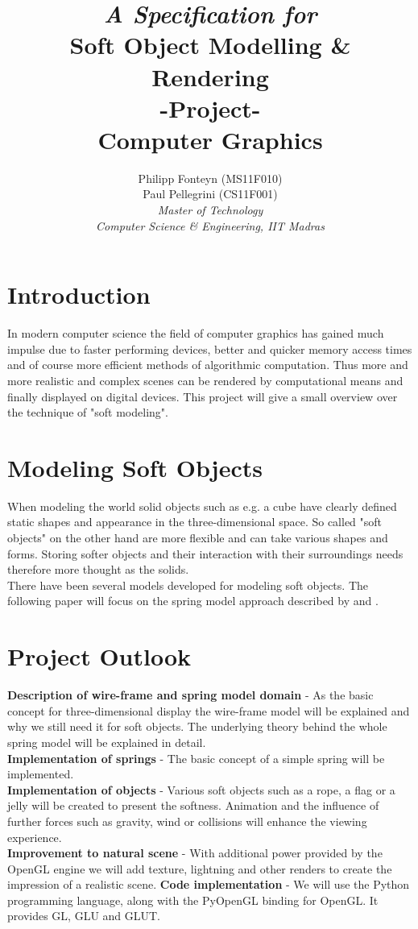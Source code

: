\documentclass[11pt]{article}
\title{
	\emph{A Specification for}\\
	\huge{\textbf{Soft Object Modelling \& Rendering} }\\
	-Project-\\
	Computer Graphics\\[2em]	
}
\author{
	Philipp Fonteyn (MS11F010)\\
	Paul Pellegrini (CS11F001)\\[2em]
	\emph{Master of Technology}\\
	\emph{Computer Science \& Engineering, IIT Madras}
}
\begin{document}
\maketitle
\newpage

%
%
%
\section{Introduction}
In modern computer science the field of computer graphics has gained much impulse due to faster performing devices, better and quicker memory access times and of course more efficient methods of algorithmic computation. Thus more and more realistic and complex scenes can be rendered by computational means and finally displayed on digital devices. This project will give a small overview over the technique of "soft modeling".
%
%
%
\section{Modeling Soft Objects}
When modeling the world solid objects such as e.g. a cube have clearly defined static shapes and appearance in the three-dimensional space. So called "soft objects" on the other hand are more flexible and can take various shapes and forms. Storing softer objects and their interaction with their surroundings needs therefore more thought as the solids.\\[1em]
%
There have been several models developed for modeling soft objects. The following paper will focus on the spring model approach described by \cite{LSCS} and \cite{hair}\cite{gama}.

%
%
%
\section{Project Outlook}
%
\textbf{Description of wire-frame and spring model domain} - As the basic concept for three-dimensional display the wire-frame model will be explained and why we still need it for soft objects. The underlying theory behind the whole spring model will be explained in detail.\\[1em]
%
\textbf{Implementation of springs} - The basic concept of a simple spring will be implemented.\\[1em]
%
\textbf{Implementation of objects} - Various soft objects such as a rope, a flag or a jelly will be created to present the softness. Animation and the influence of further forces such as gravity, wind or collisions will enhance the viewing experience.\\[1em]
%
\textbf{Improvement to natural scene} - With additional power provided by the OpenGL engine \cite{opengl} we will add texture, lightning and other renders to create the impression of a realistic scene.
%
\textbf{Code implementation} - We will use the Python programming language, along with the PyOpenGL binding for OpenGL. It provides GL, GLU and GLUT.
%
\end{document}
